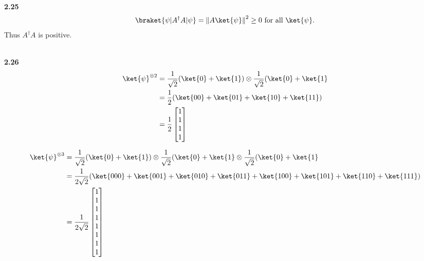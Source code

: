 \documentclass[10pt]{book}
\newcommand{\norm}[1]{\left\lVert#1\right\rVert} %
\newcommand{\Textbf}[1]{\hspace{3mm}\\ \textbf{#1}\\}
\begin{document}
		

	
	
	\Textbf{2.25}
	\begin{equation}
\begin{aligned}
		\braket{\psi | A^\dagger A | \psi} = \norm{A \ket{\psi}}^2 \geq 0 \text{ for all } \ket{\psi}.
	\end{aligned}
\end{equation}
	Thus $A^\dagger A$ is positive.
	
	
	\Textbf{2.26}
	\begin{equation}
\begin{aligned}
		\ket{\psi}^{\otimes 2} &= \frac{1}{\sqrt{2}} (\ket{0} + \ket{1}) \otimes \frac{1}{\sqrt{2}} (\ket{0} + \ket{1}\\
		&= \frac{1}{2} (\ket{00}  + \ket{01} + \ket{10} + \ket{11}  )\\
		&= \frac{1}{2} \begin{bmatrix}
			1 \\
			1 \\
			1 \\
			1
		\end{bmatrix}
	\end{aligned}
\end{equation}
	
	\begin{equation}
\begin{aligned}
		\ket{\psi}^{\otimes 3} &= \frac{1}{\sqrt{2}} (\ket{0} + \ket{1}) \otimes \frac{1}{\sqrt{2}} (\ket{0} + \ket{1}  \otimes \frac{1}{\sqrt{2}} (\ket{0} + \ket{1}\\
		&= \frac{1}{2\sqrt{2}} (\ket{000}  + \ket{001} + \ket{010} + \ket{011} +  \ket{100}  + \ket{101} + \ket{110} + \ket{111})\\
		&= \frac{1}{2\sqrt{2}} \begin{bmatrix}
			1 \\
			1 \\
			1 \\
			1 \\
			1 \\
			1 \\
			1 \\
			1
		\end{bmatrix}
	\end{aligned}
\end{equation}
	
\end{document}
